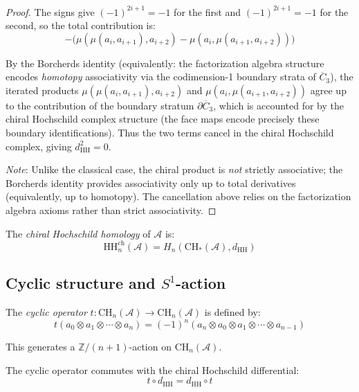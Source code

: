 \begin{proof}
The signs give $(-1)^{2i+1} = -1$ for the first and $(-1)^{2i+1} = -1$ for the second,
so the total contribution is:
\[-\bigl(\mu(\mu(a_i,a_{i+1}),a_{i+2}) - \mu(a_i,\mu(a_{i+1},a_{i+2}))\bigr)\]

By the Borcherds identity \cite[Section~3.4.7]{BD04}
(equivalently: the factorization algebra structure
encodes \emph{homotopy} associativity via the codimension-1 boundary strata
of $\overline{C}_3$), the iterated products
$\mu(\mu(a_i,a_{i+1}),a_{i+2})$ and $\mu(a_i,\mu(a_{i+1},a_{i+2}))$
agree up to the contribution of the boundary stratum $\partial \overline{C}_3$,
which is accounted for by the chiral Hochschild complex structure
(the face maps encode precisely these boundary identifications).
Thus the two terms cancel in the chiral Hochschild complex, giving $d_{\text{HH}}^2 = 0$.

\emph{Note}: Unlike the classical case, the chiral product is \emph{not} strictly associative;
the Borcherds identity provides associativity only up to total derivatives
(equivalently, up to homotopy). The cancellation above relies on the
factorization algebra axioms rather than strict associativity.
\end{proof}

\begin{definition}
\label{def:chiral-HH}
The \emph{chiral Hochschild homology} of $\mathcal{A}$ is:
\[\text{HH}_n^{\text{ch}}(\mathcal{A}) = H_n(\text{CH}_*(\mathcal{A}), d_{\text{HH}})\]
\end{definition}

\subsection{\texorpdfstring{Cyclic structure and $S^1$-action}{Cyclic structure and S 1-action}}

\begin{definition}
\label{def:cyclic-operator}
The \emph{cyclic operator} $t: \text{CH}_n(\mathcal{A}) \to \text{CH}_n(\mathcal{A})$
is defined by:
\[t(a_0 \otimes a_1 \otimes \cdots \otimes a_n) = (-1)^n (a_n \otimes a_0 \otimes a_1
 \otimes \cdots \otimes a_{n-1})\]

This generates a $\mathbb{Z}/(n+1)$-action on $\text{CH}_n(\mathcal{A})$.
\end{definition}

\begin{lemma}
\label{lem:cyclic-commutes}
The cyclic operator commutes with the chiral Hochschild differential:
\[t \circ d_{\text{HH}} = d_{\text{HH}} \circ t\]
\end{lemma}


